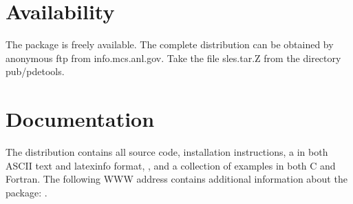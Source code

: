 \documentclass[11pt,epsf,/home/gropp/HPCCP/formats/handpage,../../tex/hyper]{article}
\begin{document}
\section*{Availability}

The  package is freely available.
The complete distribution can be obtained by anonymous ftp from
info.mcs.anl.gov.  Take the file sles.tar.Z from the directory pub/pdetools.

\section*{Documentation}

The  distribution contains all source code, 
installation instructions, a 
in both ASCII text and latexinfo format,
, 
and a collection of examples in both C and Fortran.  
The following WWW address contains additional information about the
package: .

\makeinfo
\end{document}
